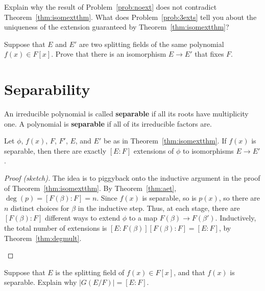 \begin{problem}
    Explain why the result of Problem~\ref{prob:noext} does not contradict Theorem~\ref{thm:isomextthm}. What does Problem~\ref{prob:3exts} tell you about the uniqueness of the extension guaranteed by Theorem~\ref{thm:isomextthm}?
\end{problem}

\begin{problem}
    Suppose that $E$ and $E'$ are two splitting fields of the same polynomial $f(x)\in F[x]$. Prove that there is an isomorphism $E \longrightarrow E'$ that fixes $F$.
\end{problem}

\section{Separability}

\begin{definition}
An irreducible polynomial is called \textbf{separable} if all its roots have multiplicity one. A polynomial is \textbf{separable} if all of its irreducible factors are.
\end{definition}
\begin{theorem}
    Let $\phi$, $f(x)$, $F$, $F'$, $E$, and $E'$ be as in Theorem~\ref{thm:isomextthm}. If $f(x)$ is separable, then there are exactly $[E:F]$ extensions of $\phi$ to isomorphisms $E \longrightarrow E'$.
    \label{thm:numexts}
\end{theorem}
\begin{proof}[Proof (sketch)] The idea is to piggyback onto the inductive argument in the proof of Theorem~\ref{thm:isomextthm}. By Theorem~\ref{thm:aet}, $\deg(p) = [F(\beta):F] = n$. Since $f(x)$ is separable, so is $p(x)$, so there are $n$ distinct choices for $\beta$ in the inductive step. Thus, at each stage, there are $[F(\beta):F]$ different ways to extend $\phi$ to a map $F(\beta) \longrightarrow F(\beta')$. Inductively, the total number of extensions is $[E:F(\beta)][F(\beta):F] = [E:F]$, by Theorem~\ref{thm:degmult}.
\begin{annotation}
\end{annotation}
\end{proof}

\begin{problem}\label{prob:sizegg}
Suppose that $E$ is the splitting field of $f(x) \in F[x]$, and that $f(x)$ is separable.  Explain why $\lvert G(E/F) \rvert = [E:F]$.
\end{problem}



